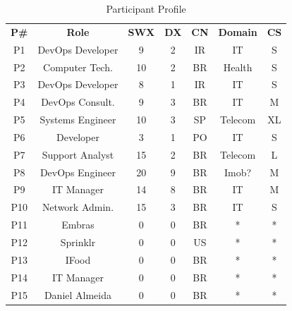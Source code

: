 \begin{table}[t]
\centering
\caption{Participant Profile}
\label{participant_table}
\begin{tabular}{ccccccc}
\textbf{P\#}          & \textbf{Role}         & \textbf{SWX} & \textbf{DX} & \textbf{CN}   & \textbf{Domain}    & \multicolumn{1}{l}{\textbf{CS}} \\
P1                   & DevOps Developer      & 9            & 2           & IR            & IT                 & S                               \\
P2                   & Computer Tech.        & 10           & 2           & BR            & Health             & S                               \\
P3                   & DevOps Developer      & 8            & 1           & IR            & IT                 & S                               \\
P4                   & DevOps Consult.       & 9            & 3           & BR            & IT                 & M                               \\
P5                   & Systems Engineer      & 10           & 3           & SP            & Telecom            & XL                              \\
P6                   & Developer             & 3            & 1           & PO            & IT                 & S                               \\
P7                   & Support Analyst       & 15           & 2           & BR            & Telecom            & L                               \\
P8                   & DevOps Engineer       & 20           & 9           & BR            & Imob?              & M                               \\
P9                   & IT Manager            & 14           & 8           & BR            & IT                 & M                               \\
P10                  & Network Admin.        & 15           & 3           & BR            & IT                 & S                               \\
P11                  & Embras                & 0            & 0           & BR            & *                  & *                               \\
P12                  & Sprinklr              & 0            & 0           & US            & *                  & *                               \\
P13                  & IFood                 & 0            & 0           & BR            & *                  & *                               \\
P14                  & IT Manager            & 0            & 0           & BR            & *                  & *                               \\
P15                  & Daniel Almeida        & 0            & 0           & BR            & *                  & *
\end{tabular}
\end{table}

